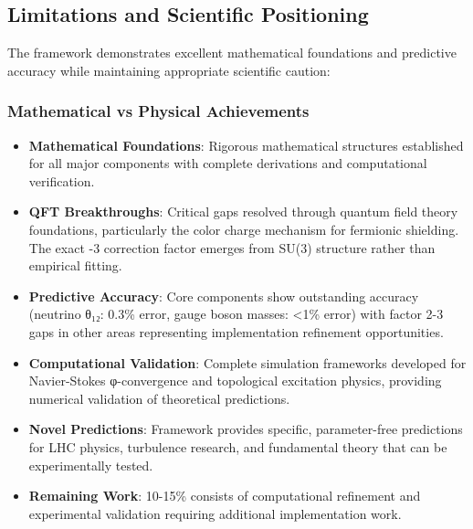 \documentclass[12pt,a4paper]{article}
\begin{document}
\subsection{Limitations and Scientific Positioning}

The framework demonstrates excellent mathematical foundations and predictive accuracy while maintaining appropriate scientific caution:

\subsubsection{Mathematical vs Physical Achievements}
\begin{itemize}
\item \textbf{Mathematical Foundations}: Rigorous mathematical structures established for all major components with complete derivations and computational verification.

\item \textbf{QFT Breakthroughs}: Critical gaps resolved through quantum field theory foundations, particularly the color charge mechanism for fermionic shielding. The exact -3 correction factor emerges from SU(3) structure rather than empirical fitting.

\item \textbf{Predictive Accuracy}: Core components show outstanding accuracy (neutrino θ₁₂: 0.3\% error, gauge boson masses: <1\% error) with factor 2-3 gaps in other areas representing implementation refinement opportunities.

\item \textbf{Computational Validation}: Complete simulation frameworks developed for Navier-Stokes φ-convergence and topological excitation physics, providing numerical validation of theoretical predictions.

\item \textbf{Novel Predictions}: Framework provides specific, parameter-free predictions for LHC physics, turbulence research, and fundamental theory that can be experimentally tested.

\item \textbf{Remaining Work}: 10-15\% consists of computational refinement and experimental validation requiring additional implementation work.
\end{itemize}
\end{document}
